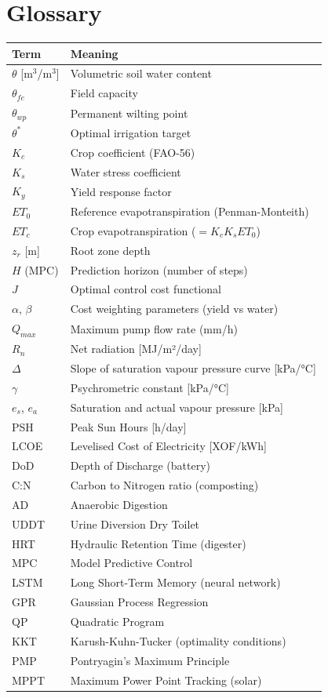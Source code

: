 \documentclass[12pt,a4paper,openany]{book}
\begin{document}
\chapter{Glossary}
\label{app:glossary}

\begin{longtable}{ll}
\toprule
\textbf{Term}&\textbf{Meaning}\\
\midrule
$\theta$ [m$^3$/m$^3$] & Volumetric soil water content\\
$\theta_{fc}$ & Field capacity\\
$\theta_{wp}$ & Permanent wilting point\\
$\theta^*$ & Optimal irrigation target\\
$K_c$ & Crop coefficient (FAO-56)\\
$K_s$ & Water stress coefficient\\
$K_{y}$ & Yield response factor\\
$ET_0$ & Reference evapotranspiration (Penman-Monteith)\\
$ET_c$ & Crop evapotranspiration ($=K_c K_s ET_0$)\\
$z_r$ [m] & Root zone depth\\
$H$ (MPC) & Prediction horizon (number of steps)\\
$J$ & Optimal control cost functional\\
$\alpha$, $\beta$ & Cost weighting parameters (yield vs water)\\
$Q_{max}$ & Maximum pump flow rate (mm/h)\\
$R_n$ & Net radiation [MJ/m²/day]\\
$\Delta$ & Slope of saturation vapour pressure curve [kPa/°C]\\
$\gamma$ & Psychrometric constant [kPa/°C]\\
$e_s$, $e_a$ & Saturation and actual vapour pressure [kPa]\\
PSH & Peak Sun Hours [h/day]\\
LCOE & Levelised Cost of Electricity [XOF/kWh]\\
DoD & Depth of Discharge (battery)\\
C:N & Carbon to Nitrogen ratio (composting)\\
AD & Anaerobic Digestion\\
UDDT & Urine Diversion Dry Toilet\\
HRT & Hydraulic Retention Time (digester)\\
MPC & Model Predictive Control\\
LSTM & Long Short-Term Memory (neural network)\\
GPR & Gaussian Process Regression\\
QP & Quadratic Program\\
KKT & Karush-Kuhn-Tucker (optimality conditions)\\
PMP & Pontryagin's Maximum Principle\\
MPPT & Maximum Power Point Tracking (solar)\\
\bottomrule
\end{longtable}
\end{document}
